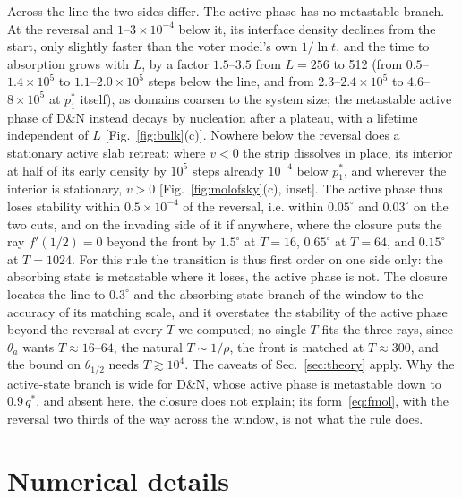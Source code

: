 \documentclass[pre,twocolumn,superscriptaddress,showpacs,floatfix]{revtex4-2}
\newcommand{\qs}{q^{*}}
\begin{document}
Across the line the two sides differ. The active phase has no metastable branch. At the
reversal and $1$--$3\times10^{-4}$ below it, its interface density declines from the start, only
slightly faster than the voter model's own $1/\ln t$, and the time to absorption grows with $L$,
by a factor $1.5$--$3.5$ from $L = 256$ to 512 (from $0.5$--$1.4\times10^5$ to
$1.1$--$2.0\times10^5$ steps below the line, and from $2.3$--$2.4\times10^5$ to
$4.6$--$8\times10^5$ at $p_1^*$ itself), as domains coarsen to the system size; the metastable
active phase of D\&N instead decays by nucleation after a plateau, with a lifetime independent
of $L$ [Fig.~\ref{fig:bulk}(c)]. Nowhere below the reversal does a stationary active slab
retreat: where $v < 0$ the strip dissolves in place, its interior at half of its early density
by $10^5$ steps already $10^{-4}$ below $p_1^*$, and wherever the interior is stationary,
$v > 0$ [Fig.~\ref{fig:molofsky}(c), inset]. The active phase thus loses stability within
$0.5\times10^{-4}$ of the reversal, i.e. within $0.05^\circ$ and $0.03^\circ$ on the two cuts,
and on the invading side of it if anywhere, where the closure puts the ray $f'(1/2) = 0$ beyond
the front by $1.5^\circ$ at $T = 16$, $0.65^\circ$ at $T = 64$, and $0.15^\circ$ at $T = 1024$.
For this rule the transition is thus first order on one side only: the absorbing state is
metastable where it loses, the active phase is not. The closure locates the line to $0.3^\circ$
and the absorbing-state branch of the window to the accuracy of its matching scale, and it
overstates the stability of the active phase beyond the reversal at every $T$ we computed; no
single $T$ fits the three rays, since $\theta_a$ wants $T\approx 16$--$64$, the natural
$T\sim 1/\rho$, the front is matched at $T\approx 300$, and the bound on $\theta_{1/2}$ needs
$T\gtrsim 10^4$. The caveats of Sec.~\ref{sec:theory} apply. Why the active-state branch is wide for D\&N, whose active phase is
metastable down to $0.9\,\qs$, and absent here, the closure does not explain; its
form~\eqref{eq:fmol}, with the reversal two thirds of the way across the window, is not what
the rule does.
\section{Numerical details}
\label{app:numerics}
\end{document}
